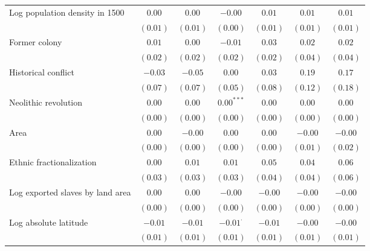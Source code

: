 \begin{sidewaystable}[H]
\begin{center}
{\begin{tabular}{l c c c c c c}
Log population density in 1500   & $0.00$       & $0.00$       & $-0.00$         & $0.01$      & $0.01$       & $0.01$      \\
                                 & $(0.01)$     & $(0.01)$     & $(0.00)$        & $(0.01)$    & $(0.01)$     & $(0.01)$    \\
Former colony                    & $0.01$       & $0.00$       & $-0.01$         & $0.03$      & $0.02$       & $0.02$      \\
                                 & $(0.02)$     & $(0.02)$     & $(0.02)$        & $(0.02)$    & $(0.04)$     & $(0.04)$    \\
Historical conflict              & $-0.03$      & $-0.05$      & $0.00$          & $0.03$      & $0.19$       & $0.17$      \\
                                 & $(0.07)$     & $(0.07)$     & $(0.05)$        & $(0.08)$    & $(0.12)$     & $(0.18)$    \\
Neolithic revolution             & $0.00$       & $0.00$       & $0.00^{***}$    & $0.00$      & $0.00$       & $0.00$      \\
                                 & $(0.00)$     & $(0.00)$     & $(0.00)$        & $(0.00)$    & $(0.00)$     & $(0.00)$    \\
Area                             & $0.00$       & $-0.00$      & $0.00$          & $0.00$      & $-0.00$      & $-0.00$     \\
                                 & $(0.00)$     & $(0.00)$     & $(0.00)$        & $(0.00)$    & $(0.01)$     & $(0.02)$    \\
Ethnic fractionalization         & $0.00$       & $0.01$       & $0.01$          & $0.05$      & $0.04$       & $0.06$      \\
                                 & $(0.03)$     & $(0.03)$     & $(0.03)$        & $(0.04)$    & $(0.04)$     & $(0.06)$    \\
Log exported slaves by land area & $0.00$       & $0.00$       & $-0.00$         & $-0.00$     & $-0.00$      & $-0.00$     \\
                                 & $(0.00)$     & $(0.00)$     & $(0.00)$        & $(0.00)$    & $(0.00)$     & $(0.00)$    \\
Log absolute latitude            & $-0.01$      & $-0.01$      & $-0.01^{\cdot}$ & $-0.01$     & $-0.00$      & $-0.00$     \\
                                 & $(0.01)$     & $(0.01)$     & $(0.01)$        & $(0.01)$    & $(0.01)$     & $(0.01)$    \\

\end{tabular}}
\end{center}
\end{sidewaystable}
